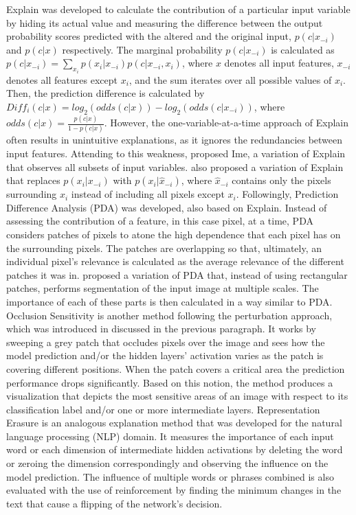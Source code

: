 \documentclass[journal]{IEEEtran}
\begin{document}
Explain \cite{Robnik-Sikonja2008} was developed to calculate the contribution of a particular input variable by hiding its actual value and measuring the difference between the output probability scores predicted with the altered and the original input, $p(c|x_{-i})$ and $p(c|x)$ respectively. The marginal probability $p(c|x_{-i})$ is calculated as $p(c|x_{-i})=\sum_{x_i} p(x_i|x_{-i})p(c|x_{-i},x_i)$, where $x$ denotes all input features, $x_{-i}$ denotes all features except $x_i$, and the sum iterates over all possible values of $x_i$. Then, the prediction difference is calculated by $Diff_i(c|x)=log_2(odds(c|x))-log_2(odds(c|x_{-i}))$, where $odds(c|x) = \frac{p(c|x)}{1-p(c|x)}$. 
However, the one-variable-at-a-time approach of Explain often results in unintuitive explanations, as it ignores the redundancies between input features. Attending to this weakness, \cite{Strumbelj2009} proposed Ime, a variation of Explain that observes all subsets of input variables. 
\cite{Zintgraf2016} also proposed a variation of Explain that replaces $p(x_i|x_{-i})$ with $p(x_i|\hat{x}_{-i})$, where $\hat{x}_{-i}$ contains only the pixels surrounding $x_i$ instead of including all pixels except $x_i$. 
Followingly, Prediction Difference Analysis (PDA) \cite{Zintgraf2017} was developed, also based on Explain. Instead of assessing the contribution of a feature, in this case pixel, at a time, PDA considers patches of pixels to atone the high dependence that each pixel has on the surrounding pixels. The patches are overlapping so that, ultimately, an individual pixel’s relevance is calculated as the average relevance of the different patches it was in.   
\cite{Seo2020} proposed a variation of PDA that, instead of using rectangular patches, performs segmentation of the input image at multiple scales. The importance of each of these parts is then calculated in a way similar to PDA.
Occlusion Sensitivity is another method following the perturbation approach, which was introduced in \cite{Zeiler2014} discussed in the previous paragraph. It works by sweeping a grey patch that occludes pixels over the image and sees how the model prediction and/or the hidden layers’ activation varies as the patch is covering different positions. When the patch covers a critical area the prediction performance drops significantly. Based on this notion, the method produces a visualization that depicts the most sensitive areas of an image with respect to its classification label and/or one or more intermediate layers.
Representation Erasure \cite{Li2016} is an analogous explanation method that was developed for the natural language processing (NLP) domain. It measures the importance of each input word or each dimension of intermediate hidden activations by deleting the word or zeroing the dimension correspondingly and observing the influence on the model prediction. The influence of multiple words or phrases combined is also evaluated with the use of reinforcement by finding the minimum changes in the text that cause a flipping of the network’s decision.   
\end{document}
